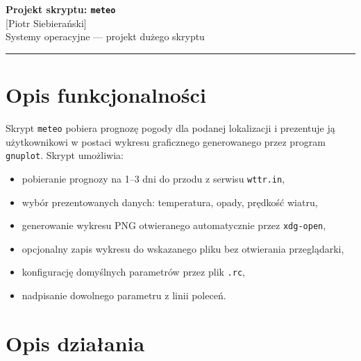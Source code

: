 \documentclass[a4paper,11pt]{article}
\begin{document}
\begin{center}
    {\LARGE\bfseries Projekt skryptu: \texttt{meteo}}\\[6pt]
    {\large [Piotr Siebierański]}\\[2pt]
    {\small Systemy operacyjne — projekt dużego skryptu}
\end{center}

\vspace{4pt}
\hrule
\vspace{12pt}

\section{Opis funkcjonalności}

Skrypt \texttt{meteo} pobiera prognozę pogody dla podanej lokalizacji
i prezentuje ją użytkownikowi w postaci wykresu graficznego generowanego
przez program \texttt{gnuplot}. Skrypt umożliwia:

\begin{itemize}[noitemsep]
    \item pobieranie prognozy na 1--3 dni do przodu z serwisu \texttt{wttr.in},
    \item wybór prezentowanych danych: temperatura, opady, prędkość wiatru,
    \item generowanie wykresu PNG otwieranego automatycznie przez \texttt{xdg-open},
    \item opcjonalny zapis wykresu do wskazanego pliku bez otwierania przeglądarki,
    \item konfigurację domyślnych parametrów przez plik \texttt{.rc},
    \item nadpisanie dowolnego parametru z linii poleceń.
\end{itemize}

\section{Opis działania}
\end{document}
